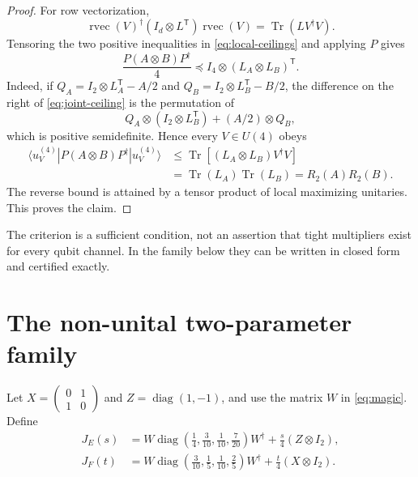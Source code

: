 \documentclass[11pt,a4paper]{article}
\theoremstyle{remark}
\DeclareMathOperator{\Tr}{Tr}
\DeclareMathOperator{\rvec}{rvec}
\newcommand{\I}{I}
\begin{document}
\begin{proof}
For row vectorization,
\begin{equation}
 \rvec(V)^\dagger(\I_d\otimes L^{\mathsf T})\rvec(V)
 =\Tr(LV^\dagger V).
 \label{eq:vec-trace}
\end{equation}
Tensoring the two positive inequalities in
\eqref{eq:local-ceilings} and applying $P$ gives
\begin{equation}
 \frac{P(A\otimes B)P^\dagger}{4}
 \preceq
 \I_4\otimes(L_A\otimes L_B)^{\mathsf T}.
 \label{eq:joint-ceiling}
\end{equation}
Indeed, if $Q_A=\I_2\otimes L_A^{\mathsf T}-A/2$ and
$Q_B=\I_2\otimes L_B^{\mathsf T}-B/2$, the difference on the right of
\eqref{eq:joint-ceiling} is the permutation of
\begin{equation}
 Q_A\otimes(\I_2\otimes L_B^{\mathsf T})
 +(A/2)\otimes Q_B,
 \label{eq:tensor-remainder}
\end{equation}
which is positive semidefinite.  Hence every $V\in U(4)$ obeys
\begin{align}
 \langle u_V^{(4)}|P(A\otimes B)P^\dagger|u_V^{(4)}\rangle
 &\leq \Tr\!\left[(L_A\otimes L_B)V^\dagger V\right]\\
 &=\Tr(L_A)\Tr(L_B)=R_2(A)R_2(B).
\end{align}
The reverse bound is attained by a tensor product of local maximizing
unitaries.  This proves the claim.
\end{proof}

The criterion is a sufficient condition, not an assertion that tight
multipliers exist for every qubit channel.  In the family below they can be
written in closed form and certified exactly.

\section{The non-unital two-parameter family}
\label{sec:family}

Let $X=\left(\begin{smallmatrix}0&1\\1&0\end{smallmatrix}\right)$ and
$Z=\operatorname{diag}(1,-1)$, and use the matrix $W$ in
\eqref{eq:magic}.  Define
\begin{align}
 J_E(s)&=W\operatorname{diag}\!\left(\frac14,\frac3{10},
             \frac1{10},\frac7{20}\right)W^\dagger
             +\frac{s}{4}(Z\otimes\I_2),\label{eq:JE}\\
 J_F(t)&=W\operatorname{diag}\!\left(\frac3{10},\frac15,
             \frac1{10},\frac25\right)W^\dagger
             +\frac{t}{4}(X\otimes\I_2).\label{eq:JF}
\end{align}
\end{document}
